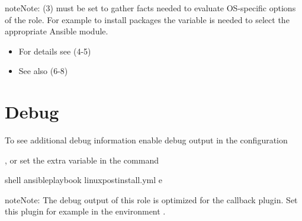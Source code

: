\documentclass[letterpaper,10pt,english]{sphinxmanual}
\begin{document}
\begin{sphinxadmonition}{note}{Note:}
 (3) must be set to gather facts
needed to evaluate OS-specific options of the role. For
example to install packages the variable 
is needed to select the appropriate Ansible module.
\end{sphinxadmonition}



\begin{itemize}
\item {} 
For details see  (4-5)

\item {} 
See also  (6-8)

\end{itemize}




\section{Debug}
\label{\detokenize{guide:debug}}\label{\detokenize{guide:ug-debug}}
To see additional debug information enable debug output in the
configuration

%
\begin{sphinxVerbatim}[commandchars=\\\{\}]
 
\end{sphinxVerbatim}
\sphinxresetverbatimhllines

, or set the extra variable in the command

%
\begin{sphinxVerbatim}[commandchars=\\\{\}]
shell\PYGZgt{} ansible\PYGZhy{}playbook linux\PYGZus{}postinstall.yml \PYGZhy{}e 
\end{sphinxVerbatim}
\sphinxresetverbatimhllines

\begin{sphinxadmonition}{note}{Note:}
The debug output of this role is optimized for the 
callback plugin. Set this plugin for example in the environment
.
\end{sphinxadmonition}
\end{document}
